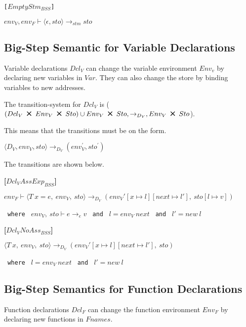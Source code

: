 \texttt{[$EmptyStm_{BSS}$]}\\
\begin{center}
	\begin{math}
		{env_V, env_F \vdash \langle \epsilon, sto \rangle \rightarrow_{stm} sto}
	\end{math}
\end{center}

\subsection{Big-Step Semantic for Variable Declarations}
Variable declarations $Dcl_V$ can change the variable environment $Env_v$ by declaring new variables in $Var$.
They can also change the store by binding variables to new addresses.

The transition-system for $Dcl_V$ is ($(Dcl_V\ \Cross\ Env_V\ \Cross\ Sto) \cup Env_V\ \Cross\ Sto, \rightarrow_{D_{V}}, Env_V\ \Cross\ Sto$).

This means that the transitions must be on the form.

\begin{center}
	$\langle D_V,env_V,sto \rangle \rightarrow_{D_V} (env_V^{'} , sto^{'})$
\end{center}

The transitions are shown below.

\textbf{[$Dcl_VAssExp_{BSS}$]}\\
\begin{center}
	\begin{math}
		{env_F \vdash \langle T\ x = e,\ env_V,\ sto \rangle \rightarrow_{D_V} (env_V'[x \mapsto l][next \mapsto l'],\ sto[l \mapsto v])}
	\end{math}
	
	\texttt{ where } $env_V,\ sto \vdash e \rightarrow_e v$
	\texttt{ and } $l = env_V\ next$
	\texttt{ and } $l' = new\ l$
\end{center}

\textbf{[$Dcl_VNoAss_{BSS}$]}\\
\begin{center}
	\begin{math}
		{\langle T\ x,\ env_V,\ sto \rangle \rightarrow_{D_V} (env_V'[x \mapsto l][next \mapsto l'],\ sto)}
	\end{math}
	
	\texttt{ where } $l = env_V\ next$
	\texttt{ and } $l' = new\ l$
\end{center}

\subsection{Big-Step Semantics for Function Declarations}
Function declarations $Dcl_F$ can change the function environment $Env_F$ by declaring new functions in $Fnames$.

